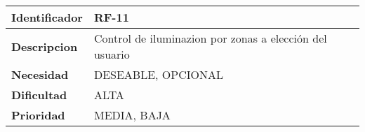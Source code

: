 \begin{center}
    \begin{tabular}{|p{2.6cm}|p{12cm}|}
    \hline
    \textbf{Identificador} & RF-11\\
    \hline
    \textbf{Descripcion} & Control de iluminazion por zonas a elección del usuario\\
    \hline
    \textbf{Necesidad} & DESEABLE, OPCIONAL\\
    \hline
    \textbf{Dificultad} & ALTA\\
    \hline
    \textbf{Prioridad} & MEDIA, BAJA\\
    \hline
    \end{tabular}
\end{center}
